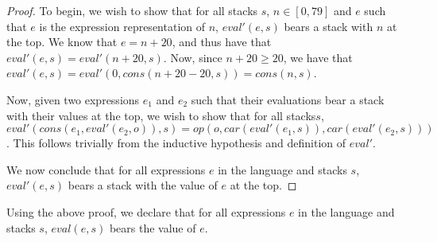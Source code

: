 \documentclass{article}
\begin{document}
\begin{proof}

To begin, we wish to show that for all stacks $s$, $n \in [0, 79]$ and $e$ such
that $e$ is the expression representation of $n$, $eval'(e, s)$ bears a stack
with $n$ at the top. We know that $e = n + 20$, and thus have that $eval'(e, s)
= eval'(n + 20, s)$. Now, since $n + 20 \ge 20$, we have that $eval'(e, s) =
eval'(0, cons(n + 20 - 20, s)) = cons(n, s)$.

Now, given two expressions $e_1$ and $e_2$ such that their evaluations bear a
stack with their values at the top, we wish to show that for all stacks$s$,
$eval'(cons(e_1, eval'(e_2, o)), s) = op(o, car(eval'(e_1, s)), car(eval'(e_2,
s)))$. This follows trivially from the inductive hypothesis and definition of $eval'$.

We now conclude that for all expressions $e$ in the language and stacks $s$,
$eval'(e, s)$ bears a stack with the value of $e$ at the top.

\end{proof}

Using the above proof, we declare that for all expressions $e$ in the language
and stacks $s$, $eval(e, s)$ bears the value of $e$. 
\end{document}
